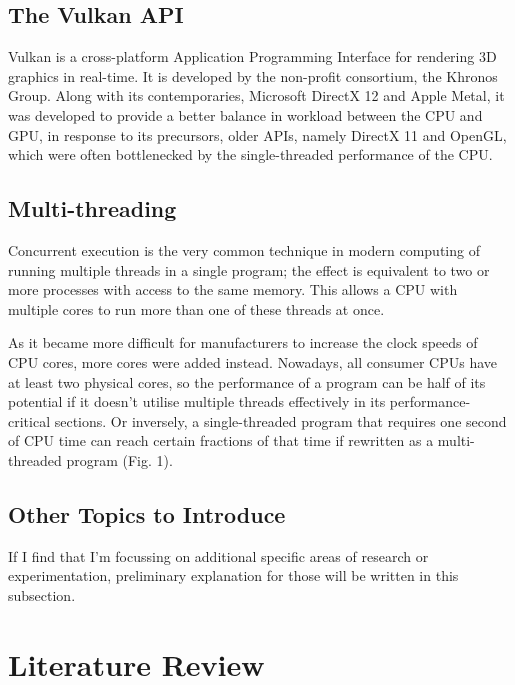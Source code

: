 \documentclass[11pt, a4paper, twocolumn]{article}
\begin{document}
\subsection{The Vulkan API}

Vulkan is a cross-platform Application Programming Interface for rendering 3D graphics in real-time. It is developed by the non-profit consortium, the Khronos Group. Along with its contemporaries, Microsoft DirectX 12 and Apple Metal, it was developed to provide a better balance in workload between the CPU and GPU, in response to its precursors, older APIs, namely DirectX 11 and OpenGL, which were often bottlenecked by the single-threaded performance of the CPU.

\subsection{Multi-threading}

Concurrent execution is the very common technique in modern computing of running multiple threads in a single program; the effect is equivalent to two or more processes with access to the same memory. This allows a CPU with multiple cores to run more than one of these threads at once.

As it became more difficult for manufacturers to increase the clock speeds of CPU cores, more cores were added instead. Nowadays, all consumer CPUs have at least two physical cores, so the performance of a program can be half of its potential if it doesn't utilise multiple threads effectively in its performance-critical sections. Or inversely, a single-threaded program that requires one second of CPU time can reach certain fractions of that time if rewritten as a multi-threaded program (Fig. 1).


\subsection{Other Topics to Introduce}

If I find that I'm focussing on additional specific areas of research or experimentation, preliminary explanation for those will be written in this subsection.

\section{Literature Review}
\end{document}
